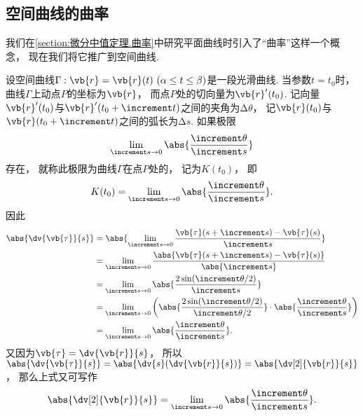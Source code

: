 \subsection{空间曲线的曲率}
我们在\cref{section:微分中值定理.曲率}中研究平面曲线时引入了“曲率”这样一个概念，
现在我们将它推广到空间曲线.

设空间曲线\(\Gamma: \vb{r} = \vb{r}(t)\ (\alpha \leq t \leq \beta)\)是一段光滑曲线.
当参数\(t = t_0\)时，曲线\(\Gamma\)上动点\(P\)的坐标为\(\vb{r}\)，
而点\(P\)处的切向量为\(\vb{r}'(t_0)\).
记向量\(\vb{r}'(t_0)\)与\(\vb{r}'(t_0+\increment t)\)之间的夹角为\(\increment\theta\)，
记\(\vb{r}(t_0)\)与\(\vb{r}(t_0+\increment t)\)之间的弧长为\(\increment s\).
如果极限\begin{equation*}
	\lim_{\increment s \to 0} \abs{ \frac{\increment\theta}{\increment s} }
\end{equation*}存在，
就称此极限为曲线\(\Gamma\)在点\(P\)处的，
记为\(K(t_0)\)，
即\begin{equation*}
	K(t_0)
	= \lim_{\increment s \to 0} \abs{ \frac{\increment\theta}{\increment s} }.
\end{equation*}
因此\begin{align*}
	\abs{ \dv{\vb{\tau}}{s} }
	&= \abs{
			\lim_{\increment s \to 0}
				\frac{\vb{\tau}(s+\increment s) - \vb{\tau}(s)}{\increment s}
		} \\
	&= \lim_{\increment s \to 0}
		\frac{\abs{\vb{\tau}(s+\increment s) - \vb{\tau}(s)}}{\abs{\increment s}} \\
	&= \lim_{\increment s \to 0}
		\abs{ \frac{2 \sin(\increment\theta / 2)}{\increment s} } \\
	&= \lim_{\increment s \to 0}
		\left(
			\abs{ \frac{2 \sin(\increment\theta / 2)}{\increment\theta/2} }
			\cdot \abs{ \frac{\increment\theta}{\increment s} }
		\right) \\
	&= \lim_{\increment s \to 0}
		\abs{ \frac{\increment\theta}{\increment s} }.
\end{align*}
又因为\(\vb{\tau} = \dv{\vb{r}}{s}\)，
所以\(\abs{ \dv{\vb{\tau}}{s} }
= \abs{ \dv{s}( \dv{\vb{r}}{s} ) }
= \abs{ \dv[2]{\vb{r}}{s} }\)，
那么上式又可写作\begin{equation}
	\abs{ \dv[2]{\vb{r}}{s} }
	= \lim_{\increment s \to 0} \abs{ \frac{\increment\theta}{\increment s} }.
\end{equation}


